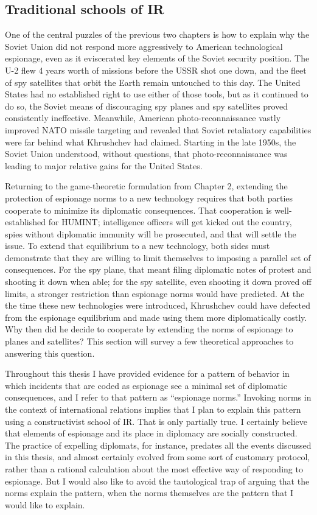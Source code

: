 \documentclass{memoir}
\begin{document}
\begin{refsegment}
\subsection{Traditional schools of IR}
One of the central puzzles of the previous two chapters is how to explain why the Soviet Union did not respond more aggressively to American technological espionage, even as it eviscerated key elements of the Soviet security position. The U-2 flew 4 years worth of missions before the USSR shot one down, and the fleet of spy satellites that orbit the Earth remain untouched to this day. The United States had no established right to use either of those tools, but as it continued to do so, the Soviet means of discouraging spy planes and spy satellites proved consistently ineffective. Meanwhile, American photo-reconnaissance vastly improved NATO missile targeting and revealed that Soviet retaliatory capabilities were far behind what Khrushchev had claimed. Starting in the late 1950s, the Soviet Union understood, without questions, that photo-reconnaissance was leading to major relative gains for the United States.

Returning to the game-theoretic formulation from Chapter 2, extending the protection of espionage norms to a new technology requires that both parties cooperate to minimize its diplomatic consequences. That cooperation is well-established for HUMINT; intelligence officers will get kicked out the country, spies without diplomatic immunity will be prosecuted, and that will settle the issue. To extend that equilibrium to a new technology, both sides must demonstrate that they are willing to limit themselves to imposing a parallel set of consequences. For the spy plane, that meant filing diplomatic notes of protest and shooting it down when able; for the spy satellite, even shooting it down proved off limits, a stronger restriction than espionage norms would have predicted. At the the time these new technologies were introduced, Khrushchev could have defected from the espionage equilibrium and made using them more diplomatically costly. Why then did he decide to cooperate by extending the norms of espionage to planes and satellites? This section will survey a few theoretical approaches to answering this question.

Throughout this thesis I have provided evidence for a pattern of behavior in which incidents that are coded as espionage see a minimal set of diplomatic consequences, and I refer to that pattern as ``espionage norms.'' Invoking norms in the context of international relations implies that I plan to explain this pattern using a constructivist school of IR. That is only partially true. I certainly believe that elements of espionage and its place in diplomacy are socially constructed. The practice of expelling diplomats, for instance, predates all the events discussed in this thesis, and almost certainly evolved from some sort of customary protocol, rather than a rational calculation about the most effective way of responding to espionage. But I would also like to avoid the tautological trap of arguing that the norms explain the pattern, when the norms themselves are the pattern that I would like to explain.


\end{refsegment}
\end{document}

